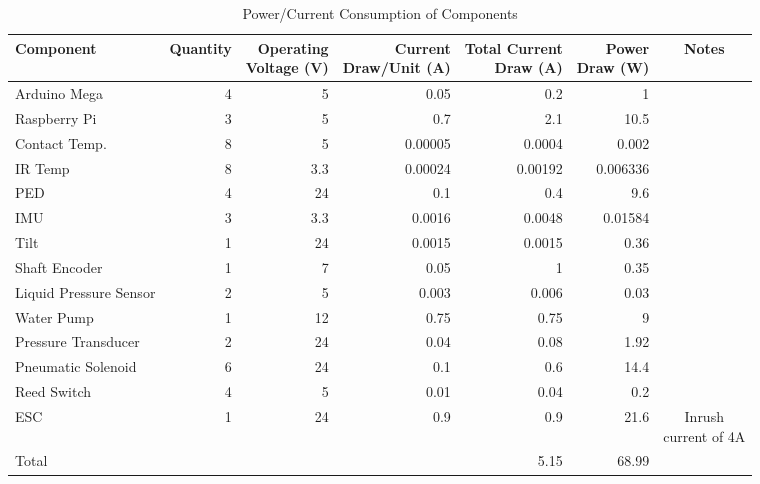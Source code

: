 \documentclass[main.tex]{subfiles}
\begin{document}
    \begin{table}[H]
        \centering
        \begin{tabular}{@{}lrrrrrc@{}} \toprule
            Component & Quantity & \makecell{Operating \\ Voltage (V)} & \makecell{Current \\ Draw/Unit (A)} & \makecell{Total Current \\ Draw (A)} & \makecell{Power \\ Draw (W)} & Notes\\ \midrule
            Arduino Mega & 4 & 5 & 0.05 & 0.2 & 1 &\\
            Raspberry Pi & 3 & 5 & 0.7 & 2.1 & 10.5 &\\
            Contact Temp. & 8 & 5 & 0.00005 & 0.0004 & 0.002 &\\
            IR Temp & 8 & 3.3 & 0.00024 & 0.00192 & 0.006336 &\\
            PED & 4 & 24 & 0.1 & 0.4 & 9.6 &\\
            IMU & 3 & 3.3 & 0.0016 & 0.0048 & 0.01584 &\\
            Tilt & 1 & 24 & 0.0015 & 0.0015 & 0.36 &\\
            Shaft Encoder & 1 & 7 & 0.05 & 1 & 0.35 &\\
            Liquid Pressure Sensor & 2 & 5 & 0.003 & 0.006 & 0.03 &\\
            Water Pump & 1 & 12 & 0.75 & 0.75 & 9 &\\
            Pressure Transducer & 2 & 24 & 0.04 & 0.08 & 1.92 &\\
            Pneumatic Solenoid & 6 & 24 & 0.1 & 0.6 & 14.4 &\\
            Reed Switch & 4 & 5 & 0.01 & 0.04 & 0.2 &\\
            ESC & 1 & 24 & 0.9 & 0.9 & 21.6 & \makecell{Inrush \\ current of 4A}\\ \midrule
            Total & & & & 5.15 & 68.99 &\\ \bottomrule
        \end{tabular}
        \caption{Power/Current Consumption of Components}
    \end{table}
\end{document}
